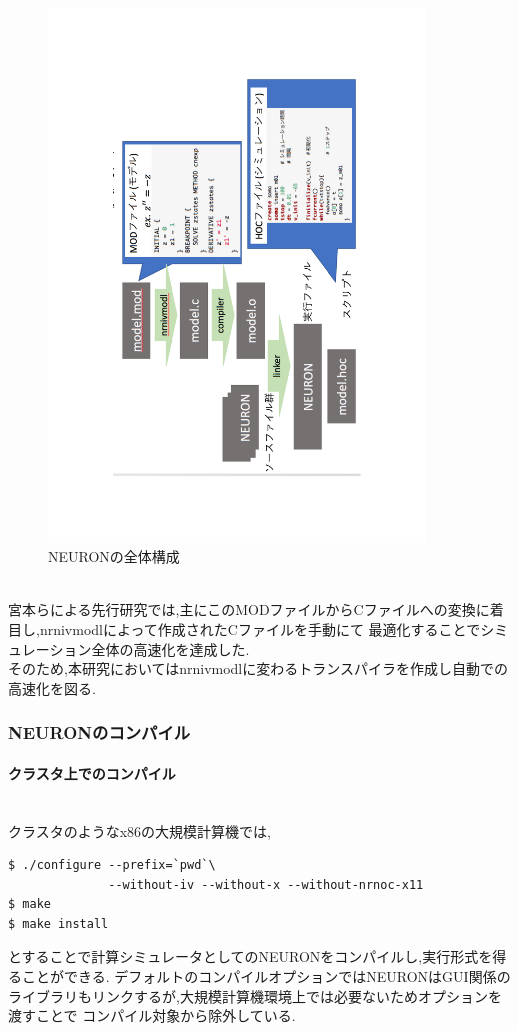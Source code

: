 \begin{figure}[htb]
  \begin{center}
    \includegraphics[width=10.0cm, angle=-90]{./images/neuron}
    \caption{NEURONの全体構成}
    \label{fig:neuron}
  \end{center}
\end{figure}~\\
宮本らによる先行研究では,主にこのMODファイルからCファイルへの変換に着目し,nrnivmodlによって作成されたCファイルを手動にて
最適化することでシミュレーション全体の高速化を達成した.\\
そのため,本研究においてはnrnivmodlに変わるトランスパイラを作成し自動での高速化を図る.\\

\subsubsection{NEURONのコンパイル}
\paragraph{クラスタ上でのコンパイル}~\\
クラスタのようなx86の大規模計算機では,
{\footnotesize
\begin{lstlisting}[caption=クラスタでのNEURONのコンパイル,label=cluster-neuron-compile,numbers=none]
$ ./configure --prefix=`pwd`\
              --without-iv --without-x --without-nrnoc-x11
$ make
$ make install
\end{lstlisting}
}
とすることで計算シミュレータとしてのNEURONをコンパイルし,実行形式を得ることができる.
デフォルトのコンパイルオプションではNEURONはGUI関係のライブラリもリンクするが,大規模計算機環境上では必要ないためオプションを渡すことで
コンパイル対象から除外している.\\
